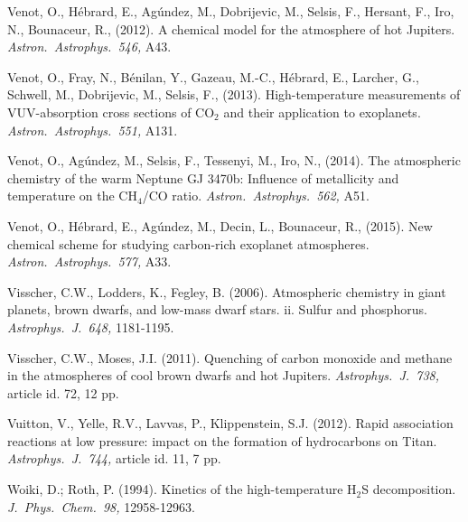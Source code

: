 \documentclass[preprint]{aastex}
\newcounter{reaction}
\begin{document}
\begin{thebibliography}{00}
 
Venot, O., H{\'e}brard, E., Ag{\'u}ndez, M., Dobrijevic, M., Selsis, F., Hersant, F., Iro, N., Bounaceur, R., (2012).
A chemical model for the atmosphere of hot Jupiters.
{\em Astron.\ Astrophys.\ 546,} A43.

Venot, O., Fray, N., B{\'e}nilan, Y., Gazeau, M.-C., H{\'e}brard, E., Larcher, G., Schwell, M., Dobrijevic, M., Selsis, F., (2013).
High-temperature measurements of VUV-absorption cross sections of CO$_{2}$ and their application to exoplanets.
{\em Astron.\ Astrophys.\ 551,} A131.

Venot, O., Ag{\'u}ndez, M., Selsis, F., Tessenyi, M., Iro, N., (2014).
The atmospheric chemistry of the warm {Neptune} {GJ} 3470b: {Influence} of metallicity and temperature on the {CH$_{4}$/CO} ratio.
{\em Astron.\ Astrophys.\ 562,} A51.

Venot, O., H{\'e}brard, E., Ag{\'u}ndez, M., Decin, L., Bounaceur, R., (2015).
New chemical scheme for studying carbon-rich exoplanet atmospheres.
{\em Astron.\ Astrophys.\ 577,} A33.

Visscher, C.W., Lodders, K., Fegley, B. (2006).
Atmospheric chemistry in giant planets, brown dwarfs, and low-mass dwarf stars. ii. Sulfur and phosphorus.
{\em Astrophys.\ J.\ 648,} 1181-1195.

Visscher, C.W., Moses, J.I. (2011).
Quenching of carbon monoxide and methane in the atmospheres of cool brown dwarfs and hot Jupiters. 
{\em Astrophys.\ J.\ 738,} article id. 72, 12 pp.


 Vuitton, V., Yelle, R.V., Lavvas, P., Klippenstein, S.J. (2012).
Rapid association reactions at low pressure: impact on the formation of hydrocarbons on Titan.
{\em Astrophys.\ J.\ 744,} article id. 11, 7 pp.

Woiki, D.; Roth, P. (1994).
Kinetics of the high-temperature H$_2$S decomposition.
{\em J.\ Phys.\ Chem.\ 98,} 12958-12963.


\end{thebibliography}
\end{document}
